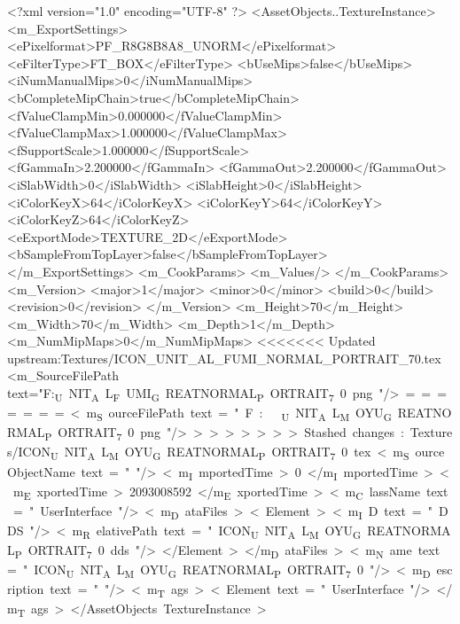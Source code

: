 <?xml version="1.0" encoding="UTF-8" ?>
<AssetObjects..TextureInstance>
	<m_ExportSettings>
		<ePixelformat>PF_R8G8B8A8_UNORM</ePixelformat>
		<eFilterType>FT_BOX</eFilterType>
		<bUseMips>false</bUseMips>
		<iNumManualMips>0</iNumManualMips>
		<bCompleteMipChain>true</bCompleteMipChain>
		<fValueClampMin>0.000000</fValueClampMin>
		<fValueClampMax>1.000000</fValueClampMax>
		<fSupportScale>1.000000</fSupportScale>
		<fGammaIn>2.200000</fGammaIn>
		<fGammaOut>2.200000</fGammaOut>
		<iSlabWidth>0</iSlabWidth>
		<iSlabHeight>0</iSlabHeight>
		<iColorKeyX>64</iColorKeyX>
		<iColorKeyY>64</iColorKeyY>
		<iColorKeyZ>64</iColorKeyZ>
		<eExportMode>TEXTURE_2D</eExportMode>
		<bSampleFromTopLayer>false</bSampleFromTopLayer>
	</m_ExportSettings>
	<m_CookParams>
		<m_Values/>
	</m_CookParams>
	<m_Version>
		<major>1</major>
		<minor>0</minor>
		<build>0</build>
		<revision>0</revision>
	</m_Version>
	<m_Height>70</m_Height>
	<m_Width>70</m_Width>
	<m_Depth>1</m_Depth>
	<m_NumMipMaps>0</m_NumMipMaps>
<<<<<<< Updated upstream:Textures/ICON_UNIT_AL_FUMI_NORMAL_PORTRAIT_70.tex
	<m_SourceFilePath text="F:\DT\lilyimages\unit\ICON_UNIT_AL_FUMI_GREATNORMAL_PORTRAIT_70.png"/>
=======
	<m_SourceFilePath text="F:\DT\lilyimages\unit\ICON_UNIT_AL_MOYU_GREATNORMAL_PORTRAIT_70.png"/>
>>>>>>> Stashed changes:Textures/ICON_UNIT_AL_MOYU_GREATNORMAL_PORTRAIT_70.tex
	<m_SourceObjectName text=""/>
	<m_ImportedTime>0</m_ImportedTime>
	<m_ExportedTime>2093008592</m_ExportedTime>
	<m_ClassName text="UserInterface"/>
	<m_DataFiles>
		<Element>
			<m_ID text="DDS"/>
			<m_RelativePath text="ICON_UNIT_AL_MOYU_GREATNORMAL_PORTRAIT_70.dds"/>
		</Element>
	</m_DataFiles>
	<m_Name text="ICON_UNIT_AL_MOYU_GREATNORMAL_PORTRAIT_70"/>
	<m_Description text=""/>
	<m_Tags>
		<Element text="UserInterface"/>
	</m_Tags>
</AssetObjects..TextureInstance>

